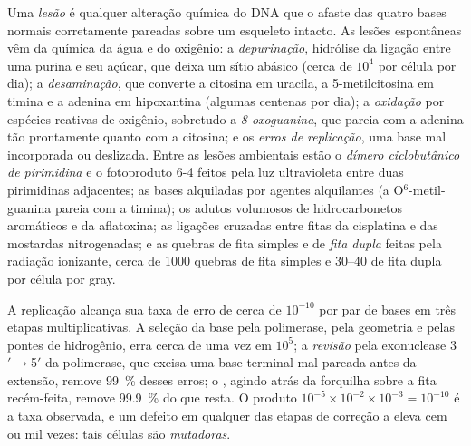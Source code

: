 \begin{definition}\label{def:b3:dna-repair:lesions}
Uma \emph{lesão} é qualquer alteração química do DNA que o afaste das
quatro bases normais corretamente pareadas sobre um esqueleto intacto.
As lesões espontâneas vêm da química da água e do oxigênio: a
\emph{depurinação}, hidrólise da ligação entre uma purina e seu
açúcar, que deixa um sítio abásico (cerca de $10^{4}$ por célula por
dia); a \emph{desaminação}, que converte a citosina em uracila, a
5-metilcitosina em timina e a adenina em hipoxantina (algumas centenas
por dia); a \emph{oxidação} por espécies reativas de oxigênio,
sobretudo a \emph{8-oxoguanina}, que pareia com a adenina tão
prontamente quanto com a citosina; e os \emph{erros de replicação},
uma base mal incorporada ou deslizada. Entre as lesões ambientais
estão o \emph{dímero ciclobutânico de pirimidina} e o fotoproduto 6-4
feitos pela luz ultravioleta entre duas pirimidinas adjacentes; as
bases alquiladas por agentes alquilantes (a O$^{6}$-metil-guanina
pareia com a timina); os adutos volumosos de hidrocarbonetos
aromáticos e da aflatoxina; as ligações cruzadas entre fitas da
cisplatina e das mostardas nitrogenadas; e as quebras de fita simples
e de \emph{fita dupla} feitas pela radiação ionizante, cerca de
\num{1000} quebras de fita simples e \numrange{30}{40} de fita dupla
por célula por gray.
\end{definition}

\begin{proposition}\label{prop:b3:dna-repair:fidelity}
A replicação alcança sua taxa de erro de cerca de $10^{-10}$ por par
de bases em três etapas multiplicativas. A seleção da base pela
polimerase, pela geometria e pelas pontes de hidrogênio, erra cerca de
uma vez em $10^{5}$; a \emph{revisão} pela exonuclease
3$'\to$5$'$ da polimerase, que excisa uma base terminal mal pareada
antes da extensão, remove \qty{99}{\%} desses erros; o \emph{}, agindo atrás da forquilha sobre a fita recém-feita,
remove \qty{99.9}{\%} do que resta. O produto
$10^{-5}\times 10^{-2}\times 10^{-3} = 10^{-10}$ é a taxa observada, e
um defeito em qualquer das etapas de correção a eleva cem ou mil
vezes: tais células são \emph{mutadoras}.
\end{proposition}

